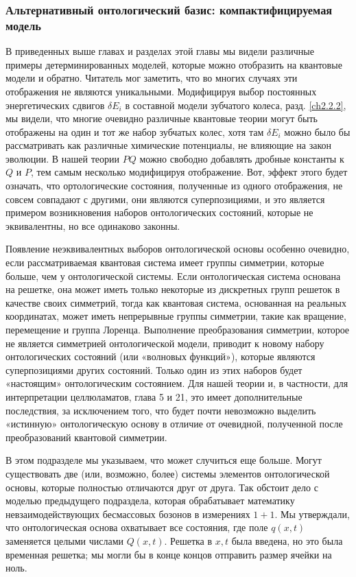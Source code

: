 \documentclass[main.tex]{subfiles}
\begin{document}
\subsubsection{Альтернативный онтологический базис: компактифицируемая модель}\label{ch17.1.4}

В приведенных выше главах и разделах этой главы мы видели различные примеры детерминированных моделей, которые можно отобразить на квантовые модели и обратно. Читатель мог заметить, что во многих случаях эти отображения не являются уникальными. Модифицируя выбор постоянных энергетических сдвигов $\delta E_i$ в составной модели зубчатого колеса, разд. \ref{ch2.2.2}, мы видели, что многие очевидно различные квантовые теории могут быть отображены на один и тот же набор зубчатых колес, хотя там $\delta E_i$ можно было бы рассматривать как различные химические потенциалы, не влияющие на закон эволюции. В нашей теории $PQ$ можно свободно добавлять дробные константы к $Q$ и $P$, тем самым несколько модифицируя отображение. Вот, эффект этого будет означать, что ортологические состояния, полученные из одного отображения, не совсем совпадают с другими, они являются суперпозициями, и это является примером возникновения наборов онтологических состояний, которые не эквивалентны, но все одинаково законны.

Появление неэквивалентных выборов онтологической основы особенно очевидно, если рассматриваемая квантовая система имеет группы симметрии, которые больше, чем у онтологической системы. Если онтологическая система основана на решетке, она может иметь только некоторые из дискретных групп решеток в качестве своих симметрий, тогда как квантовая система, основанная на реальных координатах, может иметь непрерывные группы симметрии, такие как вращение, перемещение и группа Лоренца. Выполнение преобразования симметрии, которое не является симметрией онтологической модели, приводит к новому набору онтологических состояний (или «волновых функций»), которые являются суперпозициями других состояний. Только один из этих наборов будет «настоящим» онтологическим состоянием. Для нашей теории и, в частности, для интерпретации целлюламатов, глава 5 и 21, это имеет дополнительные последствия, за исключением того, что будет почти невозможно выделить «истинную» онтологическую основу в отличие от очевидной, полученной после преобразований квантовой симметрии.

В этом подразделе мы указываем, что может случиться еще больше. Могут существовать две (или, возможно, более) системы элементов онтологической основы, которые полностью отличаются друг от друга. Так обстоит дело с моделью предыдущего подраздела, которая обрабатывает математику невзаимодействующих бесмассовых бозонов в измерениях $1+1$. Мы утверждали, что онтологическая основа охватывает все состояния, где поле $q(x, t)$ заменяется целыми числами $Q(x, t) .$ Решетка в $x, t$ была введена, но это была временная решетка; мы могли бы в конце концов отправить размер ячейки на ноль.
\end{document}
